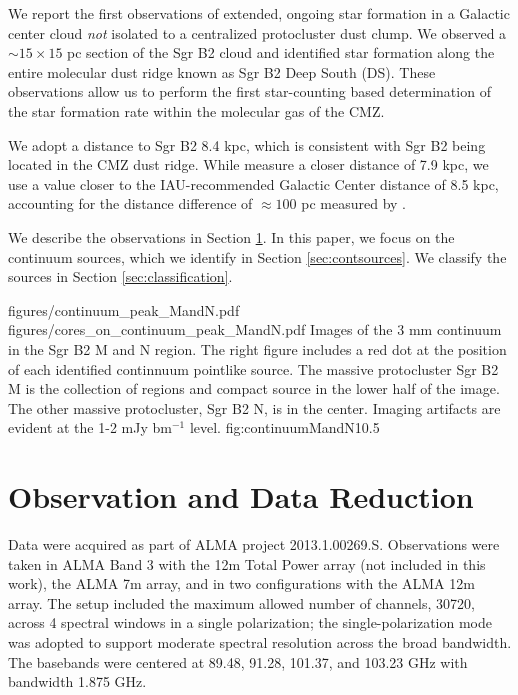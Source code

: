 \documentclass[twocolumn]{aastex61}
\newcommand{\dsgrb}{8.4 kpc\xspace}
\begin{document}
We report the first observations of extended, ongoing star formation in a
Galactic center cloud \emph{not} isolated to a centralized protocluster dust
clump.  We observed a $\sim15\times15$ pc section of the Sgr B2 cloud and
identified star formation along the entire molecular dust ridge known as Sgr B2
Deep South (DS).  These observations allow us to perform the first
star-counting based determination of the star formation rate within the
molecular gas of the CMZ.

We adopt a distance to Sgr B2 \dsgrb, which is consistent with Sgr B2 being
located in the CMZ dust ridge.  While \citet{Reid2009a} measure a closer
distance of 7.9 kpc, we use a value closer to the IAU-recommended Galactic
Center distance of 8.5 kpc, accounting for the distance difference of
$\approx100$ pc measured by \citet{Reid2009a}.

We describe the observations in Section \ref{sec:observations}. In this paper,
we focus on the continuum sources, which we identify in Section
\ref{sec:contsources}.  We classify the sources in Section
\ref{sec:classification}.  

\FigureTwo
{figures/continuum_peak_MandN.pdf}
{figures/cores_on_continuum_peak_MandN.pdf}
{Images of the 3 mm continuum in the Sgr B2 M and N region.  The right figure
includes a red dot at the position of each identified continnuum pointlike
source.  The massive protocluster Sgr B2 M is the collection of \hii regions
and compact source in the lower half of the image.  The other massive
protocluster, Sgr B2 N, is in the center.  Imaging artifacts are evident at the
1-2 mJy bm$^{-1}$ level.
}
{fig:continuumMandN}{1}{0.5\textwidth}

\section{Observation and Data Reduction}
\label{sec:observations}
Data were acquired as part of ALMA project 2013.1.00269.S.  Observations were
taken in ALMA Band 3 with the 12m Total Power array (not included in this
work), the ALMA 7m array, and in two configurations with the ALMA 12m array.
The setup included the maximum allowed number of channels, 30720, across 4
spectral windows in a single polarization; the single-polarization mode was
adopted to support moderate spectral resolution across the broad bandwidth.
The basebands were centered at 89.48, 91.28, 101.37, and 103.23 GHz with
bandwidth 1.875 GHz.
\end{document}
